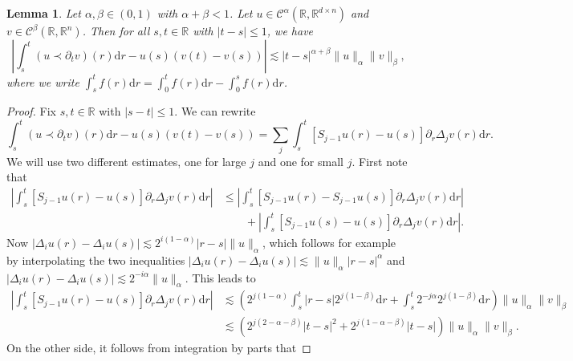 \documentclass[11pt,a4paper]{article}
\newcommand{\mathd}{\mathrm{d}}
\newtheorem{lemma}[theorem]{Lemma}
\theoremstyle{remark}
\newcommand{\R}{\mathbb{R}}
\newcommand{\CC}{\ensuremath{\mathscr{C}}}
\begin{document}
\begin{lemma}\label{lemma:controlled old and new}
  Let $\alpha , \beta \in ( 0,1 )$ with $\alpha + \beta <1$. Let $u \in \CC^\alpha(\R, \R^{d \times n})$ and $v \in \CC^{\beta}(\R, \R^n)$. Then for all $s,t \in \mathbb{R}$ with $| t-s | \leqslant 1$, we have
  \[
     \left| \int_{s}^{t} ( u \prec \partial_{t} v ) ( r ) \mathd r-u ( s ) ( v ( t ) -v ( s ) ) \right| \lesssim | t-s |^{\alpha + \beta} \| u  \|_{\alpha} \| v \|_{\beta} ,
  \]
  where we write $\int_{s}^{t} f ( r ) \mathd r= \int_{0}^{t} f ( r ) \mathd r- \int_{0}^{s} f ( r ) \mathd r$.
\end{lemma}

\begin{proof}
  Fix $s,t \in \mathbb{R}$ with $| s-t | \leqslant 1$. We can rewrite
  \[
     \int_{s}^{t} ( u \prec \partial_{t} v ) ( r ) \mathd r-u ( s ) ( v ( t ) -v ( s ) ) = \sum_{j} \int_{s}^{t} [ S_{j-1} u ( r ) -u ( s ) ] \partial_{r} \Delta_{j} v ( r ) \mathd r.
  \]
  We will use two different estimates, one for large $j$ and one for small $j$. First note that
  \begin{align*}
     \left| \int_{s}^{t} [ S_{j-1} u ( r ) -u ( s ) ] \partial_{r} \Delta_{j} v ( r ) \mathd r \right| & \leqslant \left| \int_{s}^{t} [ S_{j-1} u ( r ) -S_{j-1} u ( s ) ]  \partial_{r} \Delta_{j} v ( r ) \mathd r \right| \\
     &\qquad + \left| \int_{s}^{t} [ S_{j-1} u ( s ) -u ( s ) ] \partial_{r} \Delta_{j} v ( r ) \mathd r  \right| .
  \end{align*}
  Now $| \Delta_{i} u ( r ) - \Delta_{i} u ( s ) | \lesssim 2^{i ( 1- \alpha )} | r-s | \| u \|_{\alpha}$, which follows for example by interpolating the two inequalities $| \Delta_{i} u ( r ) - \Delta_{i} u ( s ) | \lesssim \| u \|_{\alpha} | r-s |^{\alpha}$ and $| \Delta_{i} u ( r ) - \Delta_{i} u ( s ) | \lesssim 2^{-i \alpha} \| u \|_{\alpha}$. This leads to
  \begin{align}\label{eq:controlled old and new pr1} \nonumber
     \left| \int_{s}^{t} [ S_{j-1} u ( r ) -u ( s ) ] \partial_{r} \Delta_{j} v ( r ) \mathd r \right| &\lesssim \left( 2^{j ( 1- \alpha )} \int_{s}^{t}  | r-s | 2^{j ( 1- \beta )} \mathd r+ \int_{s}^{t} 2^{-j \alpha} 2^{j ( 1- \beta )} \mathd r \right)\! \| u \|_{\alpha} \| v \|_{\beta} \\
    & \lesssim ( 2^{j ( 2- \alpha - \beta)} | t-s |^{2} +2^{j ( 1- \alpha - \beta )} | t-s | ) \| u \|_{\alpha} \| v \|_{\beta} .
  \end{align}
  On the other side, it follows from integration by parts that

\end{proof}
\end{document}
